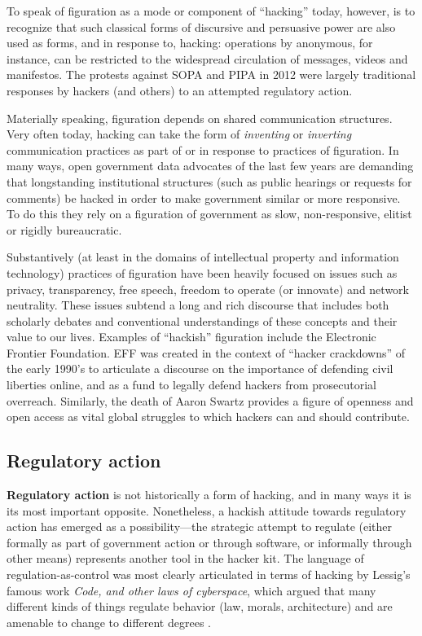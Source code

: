 \documentclass[10pt,letter,oneside]{scrartcl}
\begin{document}
To speak of figuration as a mode or component of ``hacking'' today, however, is
to recognize that such classical forms of discursive and persuasive power are
also used as forms, and in response to, hacking: operations by anonymous, for
instance, can be restricted to the widespread circulation of messages, videos
and manifestos. The protests against SOPA and PIPA in 2012 were largely
traditional responses by hackers (and others) to an attempted regulatory 
action.

Materially speaking, figuration depends on shared communication structures. Very
often today, hacking can take the form of \emph{inventing} or \emph{inverting}
communication practices as part of or in response to practices of figuration.
In many ways, open government data advocates of the last few years are demanding
that longstanding institutional structures (such as public hearings or requests
for comments) be hacked in order to make government similar or more responsive.
To do this they rely on a figuration of government as slow, non-responsive,
elitist or rigidly bureaucratic.

Substantively (at least in the domains of intellectual property and information
technology) practices of figuration have been heavily focused on issues such as
privacy, transparency, free speech, freedom to operate (or innovate) and network
neutrality.  These issues subtend a long and rich discourse that includes both
scholarly debates and conventional understandings of these concepts and their
value to our lives.  Examples of ``hackish'' figuration include the Electronic
Frontier Foundation. EFF was created in the context of ``hacker crackdowns'' of
the early 1990's to articulate a discourse on the importance of defending civil
liberties online, and as a fund to legally defend hackers from prosecutorial
overreach.  Similarly, the death of Aaron Swartz provides a figure of openness
and open access as vital global struggles to which hackers can and should
contribute.

\subsection*{Regulatory action}

\textbf{Regulatory action} is not historically a form of hacking, and in many
ways it is its most important opposite.  Nonetheless, a hackish attitude towards
regulatory action has emerged as a possibility---the strategic attempt to
regulate (either formally as part of government action or through software, or
informally through other means) represents another tool in the hacker kit.  The
language of regulation-as-control was most clearly articulated in terms of
hacking by Lessig's famous work \emph{Code, and other laws of cyberspace}, which
argued that many different kinds of things regulate behavior (law, morals,
architecture) and are amenable to change to different degrees
\cite{lessig2000code}.
\end{document}
